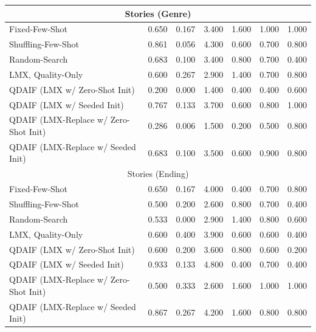 \begin{table}[ht]
\begin{tabular}{@{}lcccccc@{}}
\midrule
\multicolumn{7}{c}{Stories (Genre)} \\
\midrule
Fixed-Few-Shot & 0.650 & 0.167 & 3.400 & 1.600 & 1.000 & 1.000  \\ 
Shuffling-Few-Shot & 0.861 & 0.056 & 4.300 & 0.600 & 0.700 & 0.800  \\ 
Random-Search & 0.683 & 0.100 & 3.400 & 0.800 & 0.700 & 0.400  \\ 
LMX, Quality-Only & 0.600 & 0.267 & 2.900 & 1.400 & 0.700 & 0.800  \\ 
QDAIF (LMX w/ Zero-Shot Init) & 0.200 & 0.000 & 1.400 & 0.400 & 0.400 & 0.600  \\ 
QDAIF (LMX w/ Seeded Init) & 0.767 & 0.133 & 3.700 & 0.600 & 0.800 & 1.000  \\ 
QDAIF (LMX-Replace w/ Zero-Shot Init) & 0.286 & 0.006 & 1.500 & 0.200 & 0.500 & 0.800  \\ 
QDAIF (LMX-Replace w/ Seeded Init) & 0.683 & 0.100 & 3.500 & 0.600 & 0.900 & 0.800 \\ 
\midrule
\multicolumn{7}{c}{Stories (Ending)} \\
\midrule
Fixed-Few-Shot & 0.650 & 0.167 & 4.000 & 0.400 & 0.700 & 0.800  \\ 
Shuffling-Few-Shot & 0.500 & 0.200 & 2.600 & 0.800 & 0.700 & 0.400  \\ 
Random-Search & 0.533 & 0.000 & 2.900 & 1.400 & 0.800 & 0.600  \\ 
LMX, Quality-Only & 0.600 & 0.400 & 3.900 & 0.600 & 0.600 & 0.400  \\ 
QDAIF (LMX w/ Zero-Shot Init) & 0.600 & 0.200 & 3.600 & 0.800 & 0.600 & 0.200  \\ 
QDAIF (LMX w/ Seeded Init) & 0.933 & 0.133 & 4.800 & 0.400 & 0.700 & 0.400  \\ 
QDAIF (LMX-Replace w/ Zero-Shot Init) & 0.500 & 0.333 & 2.600 & 1.600 & 1.000 & 1.000  \\ 
QDAIF (LMX-Replace w/ Seeded Init) & 0.867 & 0.267 & 4.200 & 1.600 & 0.800 & 0.800 \\ 
\bottomrule
\end{tabular}
\end{table}
